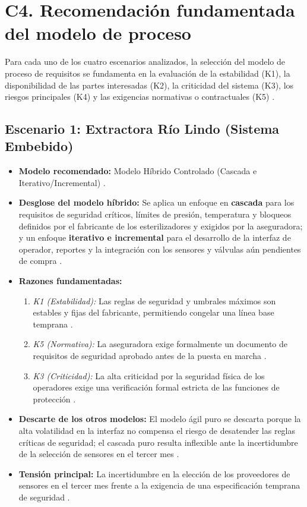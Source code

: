 \documentclass{article}
\begin{document}
\section{C4. Recomendación fundamentada del modelo de proceso}

Para cada uno de los cuatro escenarios analizados, la selección del modelo de proceso de requisitos se fundamenta en la evaluación de la estabilidad (K1), la disponibilidad de las partes interesadas (K2), la criticidad del sistema (K3), los riesgos principales (K4) y las exigencias normativas o contractuales (K5) \cite{Pohl2025}.

\subsection{Escenario 1: Extractora Río Lindo (Sistema Embebido)}
\begin{itemize}
    \item \textbf{Modelo recomendado:} Modelo Híbrido Controlado (Cascada e Iterativo/Incremental) \cite{GA_Prac_01}.
    \item \textbf{Desglose del modelo híbrido:} Se aplica un enfoque en \textbf{cascada} para los requisitos de seguridad críticos, límites de presión, temperatura y bloqueos definidos por el fabricante de los esterilizadores y exigidos por la aseguradora; y un enfoque \textbf{iterativo e incremental} para el desarrollo de la interfaz de operador, reportes y la integración con los sensores y válvulas aún pendientes de compra \cite{GA_Prac_01}.
    \item \textbf{Razones fundamentadas:}
        \begin{enumerate}
            \item \textit{K1 (Estabilidad):} Las reglas de seguridad y umbrales máximos son estables y fijas del fabricante, permitiendo congelar una línea base temprana \cite{Pohl2025}.
            \item \textit{K5 (Normativa):} La aseguradora exige formalmente un documento de requisitos de seguridad aprobado antes de la puesta en marcha \cite{GA_Prac_01}.
            \item \textit{K3 (Criticidad):} La alta criticidad por la seguridad física de los operadores exige una verificación formal estricta de las funciones de protección \cite{SWEBOK_v4_2024}.
        \end{enumerate}
    \item \textbf{Descarte de los otros modelos:} El modelo ágil puro se descarta porque la alta volatilidad en la interfaz no compensa el riesgo de desatender las reglas críticas de seguridad; el cascada puro resulta inflexible ante la incertidumbre de la selección de sensores en el tercer mes \cite{GA_Prac_01}.
    \item \textbf{Tensión principal:} La incertidumbre en la elección de los proveedores de sensores en el tercer mes frente a la exigencia de una especificación temprana de seguridad \cite{GA_Prac_01}.
\end{itemize}
\end{document}
